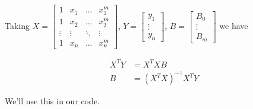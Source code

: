 Taking
$X = \begin{bmatrix}
		1      & x_1    & \dots  & x_1^m  \\
		1      & x_2    & \dots  & x_2^m  \\
		\vdots & \vdots & \ddots & \vdots \\
		1      & x_n    & \dots  & x_n^m
	\end{bmatrix}$,
$Y = \begin{bmatrix}
		y_1 \\ \vdots \\ y_n
	\end{bmatrix}$,
$B = \begin{bmatrix}
		B_0 \\ \vdots \\ B_m
	\end{bmatrix}$
we have

\begin{align}
	X^TY & = X^TXB           \\
	B    & = (X^TX)^{-1}X^TY
\end{align}

We'll use this in our code.
